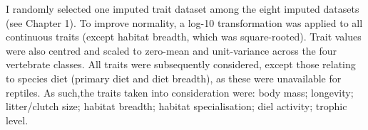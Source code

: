 I randomly selected one imputed trait dataset among the eight imputed datasets (see Chapter 1). To improve normality, a log-10 transformation was applied to all continuous traits (except habitat breadth, which was square-rooted). Trait values were also centred and scaled to zero-mean and unit-variance across the four vertebrate classes. All traits were subsequently considered, except those relating to species diet (primary diet and diet breadth), as these were unavailable for reptiles. As such,the traits taken into consideration were: body mass; longevity; litter/clutch size; habitat breadth; habitat specialisation; diel activity; trophic level.


